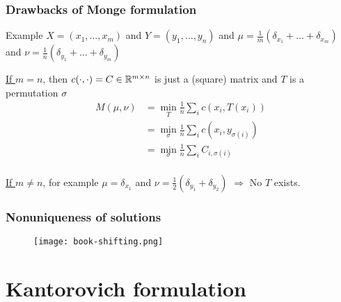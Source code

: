 \documentclass{beamer}
\begin{document}
\begin{frame}
  \frametitle{Drawbacks of Monge formulation}
  \begin{block}{Example}
    $X=(x_1, \dots, x_m)$ and $Y=(y_1, \dots, y_n)$ and
    $\mu= \frac{1}{m}(\delta_{x_1}+ \dots + \delta_{x_m})$ and $\nu= \frac{1}{n}(\delta_{y_1}+ \dots + \delta_{y_m})$
  \end{block}
  \begin{minipage}{0.5\textwidth}
    \underline{If $m=n$}, then $c(\cdot, \cdot) = C \in \mathbb{R}^{m\times n}$ is just a (square) matrix and $T$ is a permutation $\sigma$
    \begin{equation}
      \begin{aligned}
        M(\mu, \nu) &= \min_T \frac{1}{n} \sum_{i} c(x_i, T(x_i)) \\
        &= \min_\sigma \frac{1}{n} \sum_{i} c(x_i, y_{\sigma(i)}) \\
        &= \min_\sigma \frac{1}{n} \sum_{i} C_{i, \sigma(i)} \\
      \end{aligned}
    \end{equation}
  \end{minipage}
  \hfill
  \begin{minipage}{0.4\textwidth}
    \underline{If $m \neq n$}, for example $\mu=\delta_{x_1}$ and $\nu= \frac12(\delta_{y_1}+ \delta_{y_2})$
    $\Rightarrow$ No $T$ exists.
    \vspace{3.5cm}
    \vfill
  \end{minipage}
\end{frame}

\begin{frame}
  \frametitle{Nonuniqueness of solutions}
  \begin{figure}[ht]
    \centering
    \texttt{[image: book-shifting.png]}
    \caption{\label{fig:label} }
  \end{figure}
\end{frame}

\section{Kantorovich formulation}%
\label{sec:}
\end{document}

